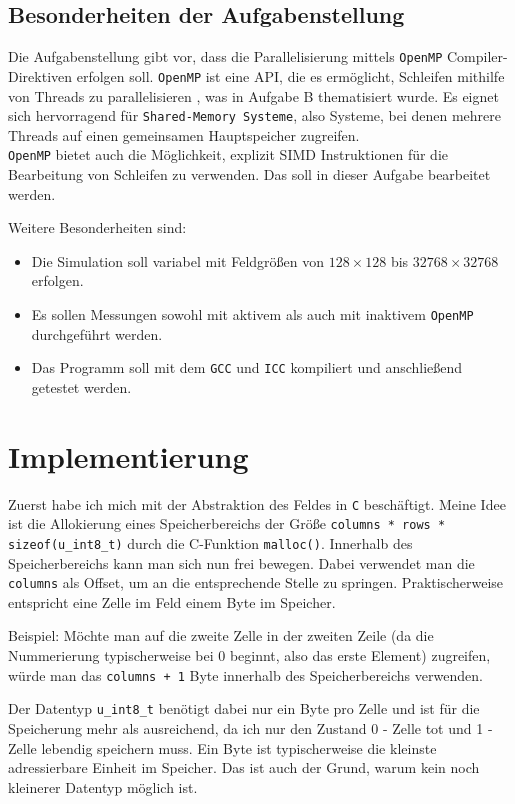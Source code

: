 \documentclass[german,plainarticle,hyperref,utf8]{zihpub}
\begin{document}
	\subsection{Besonderheiten der Aufgabenstellung}
	Die Aufgabenstellung gibt vor, dass die Parallelisierung mittels \texttt{OpenMP} Compiler-Direktiven erfolgen soll. \texttt{OpenMP} ist eine API, die es ermöglicht, Schleifen mithilfe von Threads zu parallelisieren \cite{openmp}, was in Aufgabe B thematisiert wurde. Es eignet sich hervorragend für \texttt{Shared-Memory Systeme}, also Systeme, bei denen mehrere Threads auf einen gemeinsamen Hauptspeicher zugreifen.\\
	\texttt{OpenMP} bietet auch die Möglichkeit, explizit SIMD Instruktionen für die Bearbeitung von Schleifen zu verwenden. Das soll in dieser Aufgabe bearbeitet werden.
	
	Weitere Besonderheiten sind:
	\begin{itemize}
		\item Die Simulation soll variabel mit Feldgrößen von $128\times 128$ bis $32768\times 32768$ erfolgen.
		\item Es sollen Messungen sowohl mit aktivem als auch mit inaktivem \texttt{OpenMP} durchgeführt werden.
		\item Das Programm soll mit dem \texttt{GCC} und \texttt{ICC} kompiliert und anschließend getestet werden.
	\end{itemize}
	\newpage
	\section{Implementierung}
	Zuerst habe ich mich mit der Abstraktion des Feldes in \texttt{C} beschäftigt. Meine Idee ist die Allokierung eines Speicherbereichs der Größe \texttt{columns * rows * sizeof(u\_int8\_t)} durch die C-Funktion \texttt{malloc()}. Innerhalb des Speicherbereichs kann man sich nun frei bewegen. Dabei verwendet man die \texttt{columns} als Offset, um an die entsprechende Stelle zu springen. Praktischerweise entspricht eine Zelle im Feld einem Byte im Speicher.
	
	Beispiel: Möchte man auf die zweite Zelle in der zweiten Zeile (da die Nummerierung typischerweise bei 0 beginnt, also das erste Element) zugreifen, würde man das \texttt{columns + 1} Byte innerhalb des Speicherbereichs verwenden.
	
	Der Datentyp \texttt{u\_int8\_t} benötigt dabei nur ein Byte pro Zelle und ist für die Speicherung mehr als ausreichend, da ich nur den Zustand 0 - Zelle tot und 1 - Zelle lebendig speichern muss. Ein Byte ist typischerweise die kleinste adressierbare Einheit im Speicher. Das ist auch der Grund, warum kein noch kleinerer Datentyp möglich ist.\\
	
\end{document}
